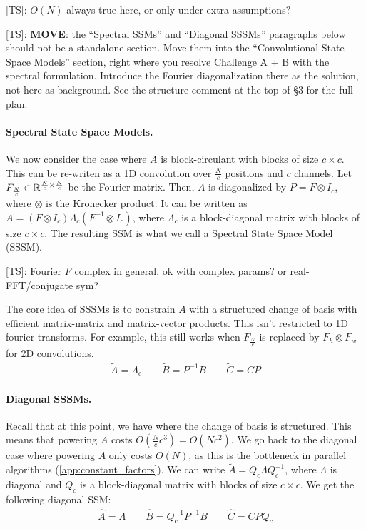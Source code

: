 \documentclass{article}
\newcommand{\TS}[1]{{\color{pink}[TS]: #1}}
\begin{document}
\TS{$O(N)$ always true here, or only under extra assumptions?}

\TS{\textbf{MOVE}: the ``Spectral SSMs'' and ``Diagonal SSSMs'' paragraphs below should not be a standalone section. Move them into the ``Convolutional State Space Models'' section, right where you resolve Challenge A + B with the spectral formulation. Introduce the Fourier diagonalization there as the solution, not here as background. See the structure comment at the top of \S3 for the full plan.}

\paragraph{Spectral State Space Models.} We now consider the case where $A$ is block-circulant with blocks of size $c \!\times\! c$. This can be re-writen as a 1D convolution over $\frac{N}{c}$ positions and $c$ channels. Let $F_{\frac{N}{c}} \in \mathbb{R}^{\frac{N}{c} \times \frac{N}{c}}$ be the Fourier matrix. Then, $A$ is diagonalized by $P = F \otimes I_c$, where $\otimes$ is the Kronecker product. It can be written as $A = (F \otimes I_c) \Lambda_c (F^{-1} \otimes I_c)$, where $\Lambda_c$ is a block-diagonal matrix with blocks of size $c \!\times\! c$. The resulting SSM is what we call a Spectral State Space Model (SSSM).

\TS{Fourier $F$ complex in general. ok with complex params? or real-FFT/conjugate sym?}

The core idea of SSSMs is to constrain $A$ with a structured change of basis with efficient matrix-matrix and matrix-vector products. This isn't restricted to 1D fourier transforms. For example, this still works when $F_{\frac{N}{c}}$ is replaced by $F_h \otimes F_w$ for 2D convolutions.
%
\begin{align}
\label{eq:ssm:spectral}
\widetilde{A} = \Lambda_c \qquad \widetilde{B} = P^{-1} B \qquad \widetilde{C} = C P
\end{align}

\paragraph{Diagonal SSSMs.} Recall that at this point, we have  where the change of basis is structured. This means that powering $A$ costs $O(\frac{N}{c} c^3) = O(N c^2)$. We go back to the diagonal case where powering $A$ only costs $O(N)$, as this is the bottleneck in parallel algorithms (\cref{app:constant_factors}). We can write $\widetilde{A} = Q_c \Lambda Q_c^{-1}$, where $\Lambda$ is diagonal and $Q_c$ is a block-diagonal matrix with blocks of size $c \!\times\! c$. We get the following diagonal SSM:
%
\begin{align}
\label{eq:ssm:diagonal_spectral}
\widehat{A} = \Lambda \qquad \widehat{B} = Q_c^{-1} P^{-1} B \qquad \widehat{C} = C P Q_c
\end{align}
\end{document}
